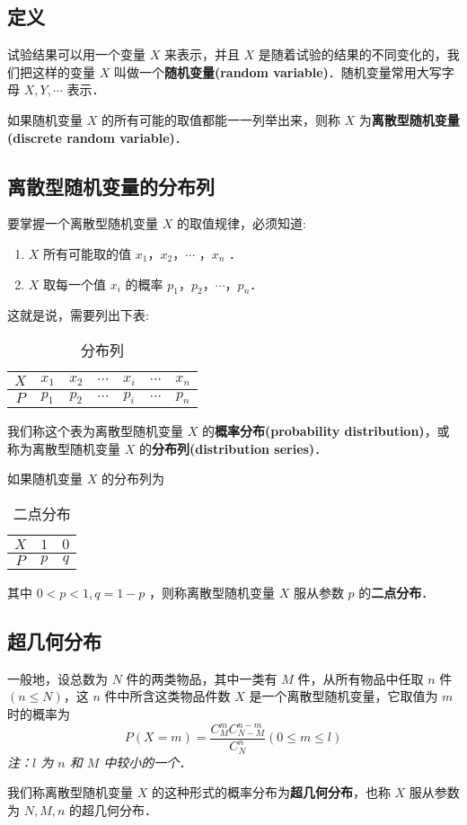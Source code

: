 

\subsection{定义}
试验结果可以用一个变量 $X$ 来表示，并且 $X$ 是随着试验的结果的不同变化的，我们把这样的变量 $X$ 叫做一个\textbf{随机变量(random variable)}．随机变量常用大写字母 $X,Y,\cdots$ 表示．

如果随机变量  $X$ 的所有可能的取值都能一一列举出来，则称 $X$ 为\textbf{离散型随机变量(discrete random variable)}．

\subsection{离散型随机变量的分布列}
要掌握一个离散型随机变量 $X$ 的取值规律，必须知道:
\begin{enumerate}
\item $X$ 所有可能取的值 $x_1$，$x_2$，$\cdots$ ，$x_n$ ．
\item $X$ 取每一个值 $x_i$ 的概率 $p_1$，$p_2$，$\cdots$，$p_n$．
\end{enumerate}
这就是说，需要列出下表:

\begin{table}[ht]
\centering
\caption{分布列}\label{HsDRV_tab1}
\begin{tabular}{|c|c|c|c|c|c|c|}
\hline
$X$ & $x_1$ & $x_2$ & $\cdots$ & $x_i$ & $\cdots$ & $x_n$ \\
\hline
$P$ & $p_1$ & $p_2$ & $\cdots$ & $p_i$ & $\cdots$ & $p_n$ \\
\hline
\end{tabular}
\end{table}
我们称这个表为离散型随机变量 $X$ 的\textbf{概率分布(probability distribution)}，或称为离散型随机变量 $X$ 的\textbf{分布列(distribution series)}．

如果随机变量 $X$ 的分布列为

\begin{table}[ht]
\centering
\caption{二点分布}\label{HsDRV_tab2}
\begin{tabular}{|c|c|c|}
\hline
$X$ & $1$ & $0$ \\
\hline
$P$ & $p$ & $q$ \\
\hline
\end{tabular}
\end{table}
其中 $0<p<1,q=1-p$ ，则称离散型随机变量 $X$ 服从参数 $p$ 的\textbf{二点分布}．

\subsection{超几何分布}
一般地，设总数为 $N$ 件的两类物品，其中一类有 $M$ 件，从所有物品中任取 $n$ 件 $(n\leqslant N)$，这 $n$ 件中所含这类物品件数 $X$ 是一个离散型随机变量，它取值为 $m$ 时的概率为
\begin{equation}
P(X=m) = \frac{C_M^mC_{N-M}^{n-m}}{C_N^n}(0\leqslant m\leqslant l)
\end{equation}
\textsl{注：$l$ 为 $n$ 和 $M$ 中较小的一个．}

我们称离散型随机变量 $X$ 的这种形式的概率分布为\textbf{超几何分布}，也称 $X$ 服从参数为 $N,M,n$ 的超几何分布．